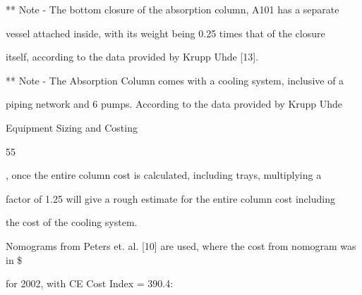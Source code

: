 \documentclass[a4paper,portrait,12pt]{article}
\begin{document}
\begin{flushleft}
** Note - The bottom closure of the absorption column, A101 has a separate
\end{flushleft}


\begin{flushleft}
vessel attached inside, with its weight being 0.25 times that of the closure
\end{flushleft}


\begin{flushleft}
itself, according to the data provided by Krupp Uhde [13].
\end{flushleft}


\begin{flushleft}
** Note - The Absorption Column comes with a cooling system, inclusive of a
\end{flushleft}


\begin{flushleft}
piping network and 6 pumps. According to the data provided by Krupp Uhde
\end{flushleft}





\begin{flushleft}
\newpage
Equipment Sizing and Costing
\end{flushleft}





55





\begin{flushleft}
[13], once the entire column cost is calculated, including trays, multiplying a
\end{flushleft}


\begin{flushleft}
factor of 1.25 will give a rough estimate for the entire column cost including
\end{flushleft}


\begin{flushleft}
the cost of the cooling system.
\end{flushleft}


\begin{flushleft}
Nomograms from Peters et. al. [10] are used, where the cost from nomogram was in \$
\end{flushleft}


\begin{flushleft}
for 2002, with CE Cost Index = 390.4:
\end{flushleft}
\end{document}
